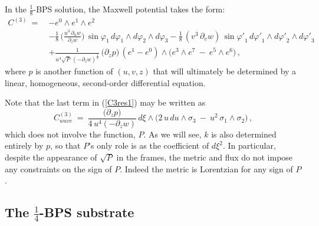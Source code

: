 \documentclass[11pt]{article}
\def\ncb{{\xi}}
\def\nBPS#1{$\frac{1}{#1}$-BPS}
\numberwithin{equation}{section}
\begin{document}
In the \nBPS{8} solution, the Maxwell potential takes the form:
% 
\begin{equation}
\begin{aligned}
 C^{(3)} ~=~ &  -  e^0 \wedge e^1 \wedge e^2 \\ & - \frac{1}{8} \,\bigg(\frac{u^3\, \partial_u w}{\partial_z w}\bigg)\,  \sin \varphi_1 \, d\varphi_1 \wedge d\varphi_2  \wedge d\varphi_3
- \frac{1}{8} \, (v^3 \,\partial_v w)\, \sin {\varphi'}_1 \, d{\varphi'}_1 \wedge d{\varphi'}_2  \wedge d{\varphi'}_3 \\
 & +  \frac{1}  {u^4 \sqrt{P}\, (-\partial_z w)^{\frac{1}{2}}} \, \big(\partial_z p \big)  \, (e^1-e^0)\wedge \big( e^3\wedge e^7~-~ e^5\wedge e^6 \big)   \,, 
 \end{aligned}
 \label{C3res1}
\end{equation}
%
where $p$ is another function of $(u,v,z)$ that will ultimately be determined by a linear, homogeneous, second-order differential equation.  

Note that the last term in (\ref{C3res1}) may be written as 
% 
\begin{equation}
 C^{(3)}_{wave} ~=~   \frac{\big( \partial_z p \big) }  {4\, u^4  (-\partial_z w)} \, d\xi \wedge \big( 2\, u \,du \wedge \sigma_3~-~u^2 \, \sigma_1 \wedge\sigma_2 \big)   \,, 
 \label{C3part1}
\end{equation}
%
which does not involve the function, $P$.  As we will see, $k$ is also determined entirely by $p$, so that $P$'s only role is as the coefficient of $d\ncb^2$.  In particular, despite the appearance of $\sqrt{P}$ in the  frames, the metric and flux do not impose any constraints on the sign of $P$.  Indeed the metric is Lorentzian for any sign of $P$.

\subsection{The \nBPS{4} substrate}
\label{ss:substrate}
\end{document}
